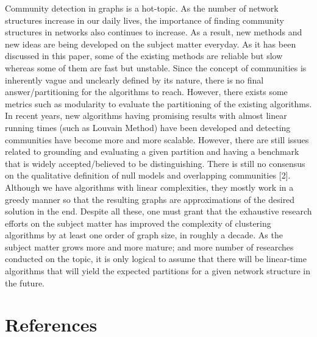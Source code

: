 \documentclass[10pt]{article}
\begin{document}
Community detection in graphs is a hot-topic. As the number of network structures increase in our daily lives, the importance of finding community structures in networks also continues to increase. As a result, new methods and new ideas are being developed on the subject matter everyday. As it has been discussed in this paper, some of the existing methods are reliable but slow whereas some of them are fast but unstable. Since the concept of communities is inherently vague and unclearly defined by its nature, there is no final answer/partitioning for the algorithms to reach. However, there exists some metrics such as modularity to evaluate the partitioning of the existing algorithms. \\

In recent years, new algorithms having promising results with almost linear running times (such as Louvain Method) have been developed and detecting communities have become more and more scalable. However, there are still issues related to grounding and evaluating a given partition and having a benchmark that is widely accepted/believed to be distinguishing. There is still no consensus on the qualitative definition of null models and overlapping communities [2]. Although we have algorithms with linear complexities, they mostly work in a greedy manner so that the resulting graphs are approximations of the desired solution in the end. Despite all these, one must grant that the exhaustive research efforts on the subject matter has improved the complexity of clustering algorithms by at least one order of graph size, in roughly a decade. As the subject matter grows more and more mature; and more number of researches conducted on the topic, it is only logical to assume that there will be linear-time algorithms that will yield the expected partitions for a given network structure in the future. \\

\section{References} 
\end{document}
